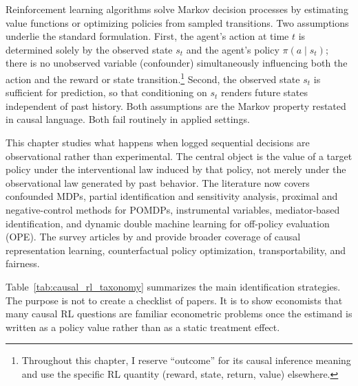 %

Reinforcement learning algorithms solve Markov decision processes by estimating value functions or optimizing policies from sampled transitions. Two assumptions underlie the standard formulation. First, the agent's action at time $t$ is determined solely by the observed state $s_t$ and the agent's policy $\pi(a \mid s_t)$; there is no unobserved variable (confounder) simultaneously influencing both the action and the reward or state transition.\footnote{Throughout this chapter, I reserve ``outcome'' for its causal inference meaning and use the specific RL quantity (reward, state, return, value) elsewhere.}
Second, the observed state $s_t$ is sufficient for prediction, so that conditioning on $s_t$ renders future states independent of past history. Both assumptions are the Markov property restated in causal language. Both fail routinely in applied settings.

This chapter studies what happens when logged sequential decisions are observational rather than experimental. The central object is the value of a target policy under the interventional law induced by that policy, not merely under the observational law generated by past behavior. The literature now covers confounded MDPs, partial identification and sensitivity analysis, proximal and negative-control methods for POMDPs, instrumental variables, mediator-based identification, and dynamic double machine learning for off-policy evaluation (OPE). The survey articles by \citet{deng2023causal} and \citet{dacostacunha2025unifying} provide broader coverage of causal representation learning, counterfactual policy optimization, transportability, and fairness.

Table~\ref{tab:causal_rl_taxonomy} summarizes the main identification strategies. The purpose is not to create a checklist of papers. It is to show economists that many causal RL questions are familiar econometric problems once the estimand is written as a policy value rather than as a static treatment effect.

